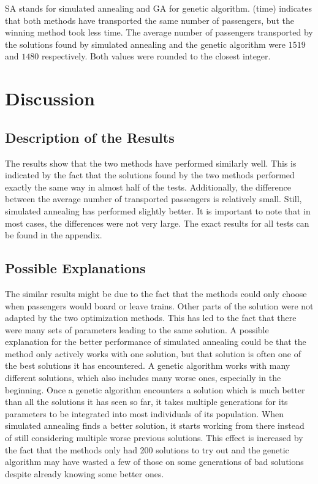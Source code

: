 \documentclass[10pt]{scrreprt}
\begin{document}

SA stands for simulated annealing and GA for genetic algorithm. (time) indicates that both methods have transported the same number of passengers, but the winning method took less time. The average number of passengers transported by the solutions found by simulated annealing and the genetic algorithm were $1519$ and $1480$ respectively. Both values were rounded to the closest integer.

\chapter{Discussion}

\section{Description of the Results}
The results show that the two methods have performed similarly well. This is indicated by the fact that the solutions found by the two methods performed exactly the same way in almost half of the tests. Additionally, the difference between the average number of transported passengers is relatively small. Still, simulated annealing has performed slightly better. It is important to note that in most cases, the differences were not very large. The exact results for all tests can be found in the appendix.


\section{Possible Explanations}
The similar results might be due to the fact that the methods could only choose when passengers would board or leave trains. Other parts of the solution were not adapted by the two optimization methods. This has led to the fact that there were many sets of parameters leading to the same solution. A possible explanation for the better performance of simulated annealing could be that the method only actively works with one solution, but that solution is often one of the best solutions it has encountered. A genetic algorithm works with many different solutions, which also includes many worse ones, especially in the beginning. Once a genetic algorithm encounters a solution which is much better than all the solutions it has seen so far, it takes multiple generations for its parameters to be integrated into most individuals of its population. When simulated annealing finds a better solution, it starts working from there instead of still considering multiple worse previous solutions. This effect is increased by the fact that the methods only had 200 solutions to try out and the genetic algorithm may have wasted a few of those on some generations of bad solutions despite already knowing some better ones.
\end{document}
